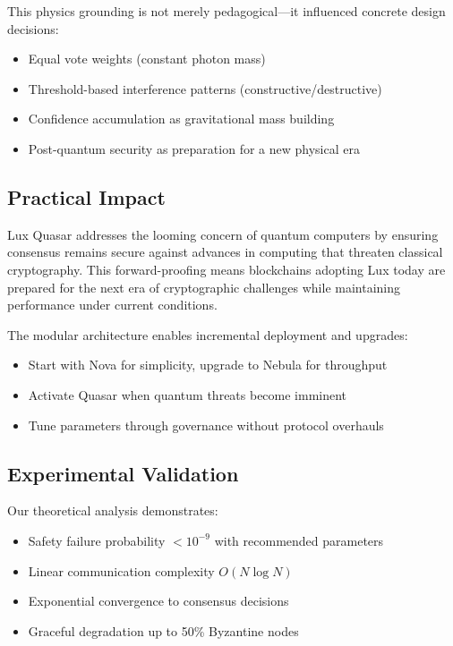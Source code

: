 This physics grounding is not merely pedagogical—it influenced concrete design decisions:
\begin{itemize}
\item Equal vote weights (constant photon mass)
\item Threshold-based interference patterns (constructive/destructive)
\item Confidence accumulation as gravitational mass building
\item Post-quantum security as preparation for a new physical era
\end{itemize}

\subsection{Practical Impact}

Lux Quasar addresses the looming concern of quantum computers by ensuring consensus remains secure against advances in computing that threaten classical cryptography. This forward-proofing means blockchains adopting Lux today are prepared for the next era of cryptographic challenges while maintaining performance under current conditions.

The modular architecture enables incremental deployment and upgrades:
\begin{itemize}
\item Start with Nova for simplicity, upgrade to Nebula for throughput
\item Activate Quasar when quantum threats become imminent
\item Tune parameters through governance without protocol overhauls
\end{itemize}

\subsection{Experimental Validation}

Our theoretical analysis demonstrates:
\begin{itemize}
\item Safety failure probability $< 10^{-9}$ with recommended parameters
\item Linear communication complexity $O(N \log N)$ 
\item Exponential convergence to consensus decisions
\item Graceful degradation up to 50\% Byzantine nodes
\end{itemize}

